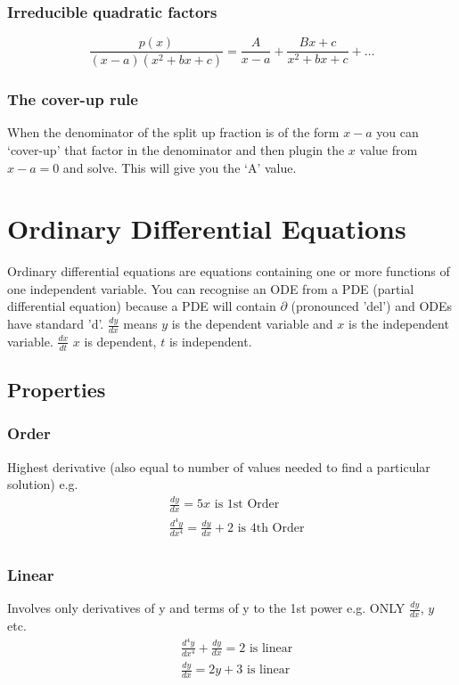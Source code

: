 \documentclass[12pt] {article}
\begin{document}
\subsubsection*{Irreducible quadratic factors}
\begin{equation*}
  \frac{p(x)}{(x-a)(x^2+bx+c)} = \frac{A}{x-a} + \frac{Bx+c}{x^2+bx+c} + \dotsc
\end{equation*}
\subsubsection*{The cover-up rule}
When the denominator of the split up fraction is of the form $x-a$ you can `cover-up' that factor in the denominator
and then plugin the $x$ value from $x-a=0$ and solve. This will give you the `A' value.

\section{Ordinary Differential Equations}
Ordinary differential equations are equations containing one or more functions of one independent variable. 
You can recognise an ODE from a PDE (partial differential equation) because a PDE will contain $\partial$ (pronounced 'del')
and ODEs have standard 'd'. $\frac{dy}{dx}$ means $y$ is the dependent variable and $x$ is the independent variable. $\frac{dx}{dt}$ $x$ is dependent, $t$ is independent.

\subsection*{Properties}
\subsubsection*{Order}
Highest derivative (also equal to number of values needed to find a particular solution) e.g.
\begin{align*}
    &\frac{dy}{dx} = 5x \text{ is 1st Order} \\
    &\frac{d^4y}{dx^4} = \frac{dy}{dx} + 2 \text{ is 4th Order} \\
\end{align*}

\subsubsection*{Linear}
Involves only derivatives of y and terms of y to the 1st power e.g. ONLY $\frac{dy}{dx}$, $y$ etc.
\begin{align*}
    &\frac{d^4y}{dx^4} + \frac{dy}{dx} = 2 \text{ is linear} \\
    &\frac{dy}{dx} = 2y + 3 \text{ is linear} \\
\end{align*}
\end{document}
